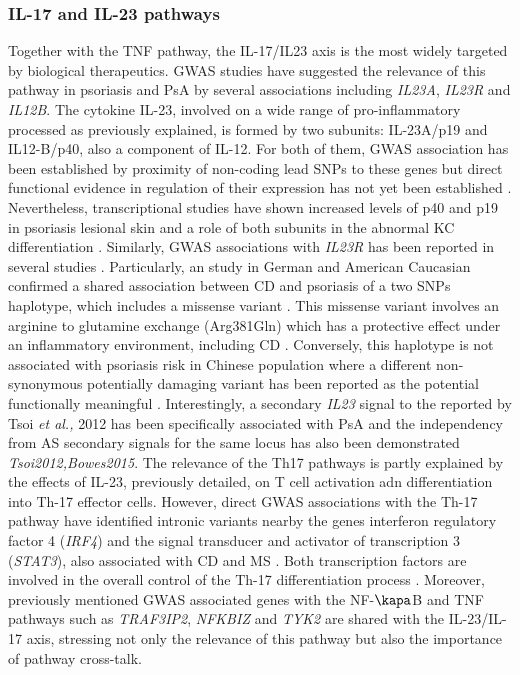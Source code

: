 
\subsubsection*{IL-17 and IL-23 pathways}
Together with the TNF pathway, the IL-17/IL23 axis is the most widely targeted by biological therapeutics. GWAS studies have suggested the relevance of this pathway in psoriasis and PsA by several associations including \textit{IL23A}, \textit{IL23R} and \textit{IL12B}. The cytokine IL-23, involved on a wide range of pro-inflammatory processed as previously explained, is formed by two subunits: IL-23A/p19 and IL12-B/p40, also a component of IL-12. For both of them, GWAS association has been established by proximity of non-coding lead SNPs to these genes but direct functional evidence in regulation of their expression has not yet been established \parencite{Strange2010,Tsoi2012}. Nevertheless, transcriptional studies have shown increased levels of p40 and p19 in psoriasis lesional skin and a role of both subunits in the abnormal KC differentiation \parencite{Lee2004,Zhu2011}. Similarly, GWAS associations with \textit{IL23R} has been reported in several studies \parencite{Nair2008, Strange2010}. Particularly, an study in German and American Caucasian confirmed a shared association between CD and psoriasis of a two SNPs haplotype, which includes a missense variant \parencite{Nair2008}. This missense variant involves an arginine to glutamine exchange (Arg381Gln) which has a protective effect under an inflammatory environment, including CD \parencite{Duerr2006}. Conversely, this haplotype is not associated with psoriasis risk in Chinese population where a different non-synonymous potentially damaging variant has been reported as the potential functionally meaningful \parencite{Tang2014}. Interestingly, a secondary \textit{IL23} signal to the reported by Tsoi \textit{et al.,} 2012 has been specifically associated with PsA and the independency from AS secondary signals for the same locus has also been demonstrated \textit{Tsoi2012,Bowes2015}. 
The relevance of the Th17 pathways is partly explained by the effects of IL-23, previously detailed, on T cell activation adn differentiation into Th-17 effector cells. However, direct GWAS associations with the Th-17 pathway have identified intronic variants nearby the genes interferon regulatory factor 4 (\textit{IRF4}) and the signal transducer and activator of transcription 3 (\textit{STAT3}), also associated with CD and MS \parencite{Tsoi2012, Immunobase}. Both transcription factors are involved in the overall control of the Th-17 differentiation process \parencite{Huber2008,Harris2007}. Moreover, previously mentioned GWAS associated genes with the NF-$\kapa$B and TNF pathways such as \textit{TRAF3IP2}, \textit{NFKBIZ} and \textit{TYK2} are shared with the IL-23/IL-17 axis, stressing not only the relevance of this pathway but also the importance of pathway cross-talk.




